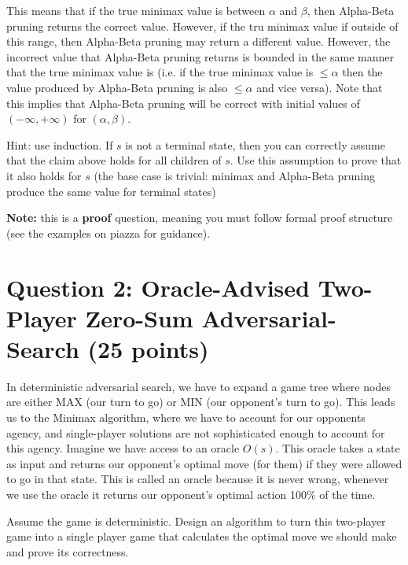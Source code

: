 \documentclass[11pt]{article}
\newcommand{\question}[1]{\section*{\normalsize #1}}
\begin{document}
\noindent This means that if the true minimax value is between $\alpha$ and $\beta$, then Alpha-Beta pruning returns the correct value. However, if the tru minimax value if outside of this range, then Alpha-Beta pruning may return a different value. However, the incorrect value that Alpha-Beta pruning returns is bounded in the same manner that the true minimax value is (i.e. if the true minimax value is $\le \alpha$ then the value produced by Alpha-Beta pruning is also $\le \alpha$ and vice versa). Note that this implies that Alpha-Beta pruning will be correct with initial values of $(-\infty, +\infty)$ for $(\alpha, \beta)$.\newline\newline

\noindent Hint: use induction. If $s$ is not a terminal state, then you can correctly assume that the claim above holds for all children of $s$. Use this assumption to prove that it also holds for $s$ (the base case is trivial: minimax and Alpha-Beta pruning produce the same value for terminal states)\newline

\noindent\textbf{Note:} this is a \textbf{proof} question, meaning you must follow formal proof structure (see the examples on piazza for guidance).\newpage















\question{Question 2: Oracle-Advised Two-Player Zero-Sum Adversarial-Search  (25 points)}
In deterministic adversarial search, we have to expand a game tree where nodes are either MAX (our turn to go) or MIN (our opponent's turn to go). This leads us to the Minimax algorithm, where we have to account for our opponents agency, and single-player solutions are not sophisticated enough to account for this agency. Imagine we have access to an oracle $O(s)$. This oracle takes a state as input and returns our opponent's optimal move (for them) if they were allowed to go in that state. This is called an oracle because it is never wrong, whenever we use the oracle it returns our opponent's optimal action 100\% of the time.\newline

\noindent Assume the game is deterministic. Design an algorithm to turn this two-player game into a single player game that calculates the optimal move we should make and prove its correctness.\newline
\end{document}
